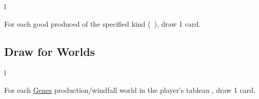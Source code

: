 \documentclass[letterpaper,landscape,twocolumn,8pt]{extarticle}
\newcommand{\inline}[1]{\scalerel*{#1}{M}}
\begin{document}
\begin{minipage}[t]{0.31\columnwidth}
\begin{wrapfigure}{l}{\columnwidth}
    
\end{wrapfigure}

For each good produced of the specified kind
\mbox{(\inline{}
\inline{}
\inline{}
\inline{})}, draw 1 card.
\subsection*{Draw for Worlds}

\begin{wrapfigure}{l}{\columnwidth}
    
\end{wrapfigure}

For each \underline{Genes} production/windfall world in the player's tableau ,
draw 1 card.




\end{minipage}
\end{document}
